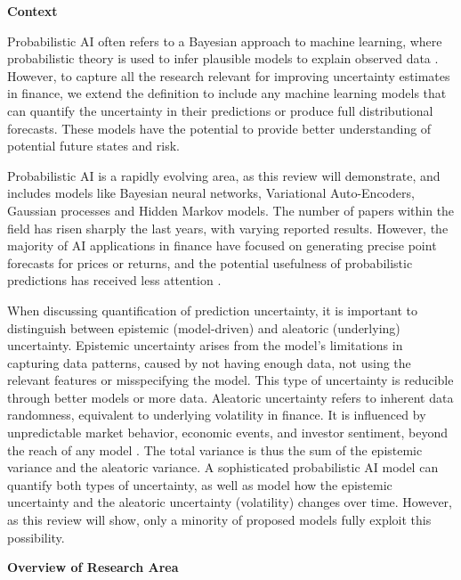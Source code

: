 \textbf{Context}\nopagebreak

Probabilistic AI often refers to a Bayesian approach to machine learning, where probabilistic theory is used to infer plausible models to explain observed data \parencite{Ghahramani2015}. However, to capture all the research relevant for improving uncertainty estimates in finance, we extend the definition to include any machine learning models that can quantify the uncertainty in their predictions or produce full distributional forecasts. These models have the potential to provide better understanding of potential future states and risk.

Probabilistic AI is a rapidly evolving area, as this review will demonstrate, and includes models like Bayesian neural networks, Variational Auto-Encoders, Gaussian processes and Hidden Markov models. The number of papers within the field has risen sharply the last years, with varying reported results. However, the majority of AI applications in finance have focused on generating precise point forecasts for prices or returns, and the potential usefulness of probabilistic predictions has received less attention \parencite{sezer2020financial}.

When discussing quantification of prediction uncertainty, it is important to distinguish between epistemic (model-driven) and aleatoric (underlying) uncertainty. Epistemic uncertainty arises from the model's limitations in capturing data patterns, caused by not having enough data, not using the relevant features or misspecifying the model. This type of uncertainty is reducible through better models or more data. Aleatoric uncertainty refers to inherent data randomness, equivalent to underlying volatility in finance. It is influenced by unpredictable market behavior, economic events, and investor sentiment, beyond the reach of any model \parencite[7,34]{pml1Book, KIUREGHIAN2009105, hullermeier2021aleatoric}. The total variance is thus the sum of the epistemic variance and the aleatoric variance. A sophisticated probabilistic AI model can quantify both types of uncertainty, as well as model how the epistemic uncertainty and the aleatoric uncertainty (volatility) changes over time. However, as this review will show, only a minority of proposed models fully exploit this possibility.



\textbf{Overview of Research Area}\nopagebreak

